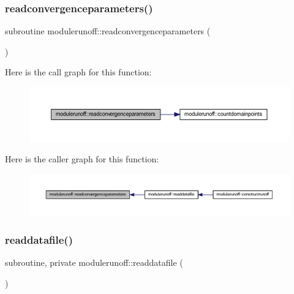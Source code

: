 \subsubsection{\texorpdfstring{readconvergenceparameters()}{readconvergenceparameters()}}
{\footnotesize\ttfamily subroutine modulerunoff\+::readconvergenceparameters (\begin{DoxyParamCaption}{ }\end{DoxyParamCaption})\hspace{0.3cm}{\ttfamily [private]}}

Here is the call graph for this function\+:
\nopagebreak
\begin{figure}[H]
\begin{center}
\leavevmode
\includegraphics[width=350pt]{namespacemodulerunoff_a82e45fea3cfee6af75a962d5a7d2224b_cgraph}
\end{center}
\end{figure}
Here is the caller graph for this function\+:
\nopagebreak
\begin{figure}[H]
\begin{center}
\leavevmode
\includegraphics[width=350pt]{namespacemodulerunoff_a82e45fea3cfee6af75a962d5a7d2224b_icgraph}
\end{center}
\end{figure}
\mbox{\label{namespacemodulerunoff_aa5edc73e0e11d57e48fd2c2b7dd60845}} 
\subsubsection{\texorpdfstring{readdatafile()}{readdatafile()}}
{\footnotesize\ttfamily subroutine, private modulerunoff\+::readdatafile (\begin{DoxyParamCaption}{ }\end{DoxyParamCaption})\hspace{0.3cm}{\ttfamily [private]}}

